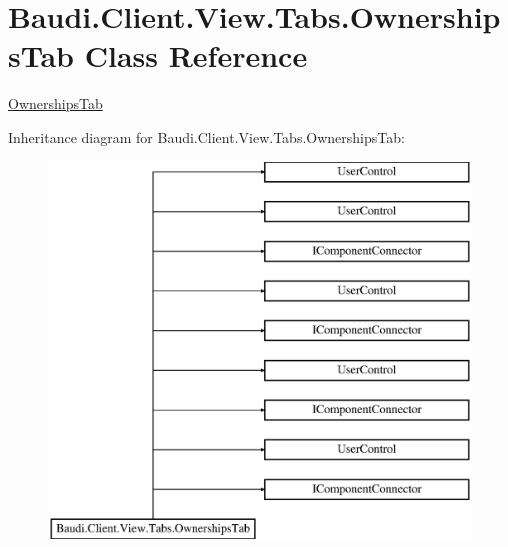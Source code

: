 \hypertarget{class_baudi_1_1_client_1_1_view_1_1_tabs_1_1_ownerships_tab}{}\section{Baudi.\+Client.\+View.\+Tabs.\+Ownerships\+Tab Class Reference}
\label{class_baudi_1_1_client_1_1_view_1_1_tabs_1_1_ownerships_tab}


\hyperlink{class_baudi_1_1_client_1_1_view_1_1_tabs_1_1_ownerships_tab}{Ownerships\+Tab}  


Inheritance diagram for Baudi.\+Client.\+View.\+Tabs.\+Ownerships\+Tab\+:\begin{figure}[H]
\begin{center}
\leavevmode
\includegraphics[height=10.000000cm]{class_baudi_1_1_client_1_1_view_1_1_tabs_1_1_ownerships_tab}
\end{center}
\end{figure}
